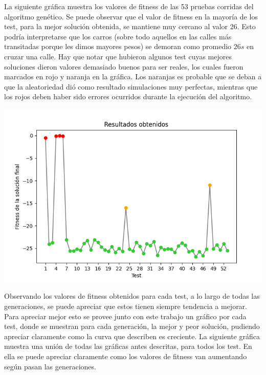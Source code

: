 \documentclass[colorinlistoftodos,twoside,twocolumn]{article} %
\begin{document}
	La siguiente gr\'afica muestra los valores de fitness de las 53 pruebas corridas del algoritmo gen\'etico. Se puede observar que el valor de fitness en la mayor\'ia de los test, para la mejor soluci\'on obtenida, se mantiene muy cercano al valor 26. Esto podr\'ia interpretarse que los carros (sobre todo aquellos en las calles m\'as transitadas porque les dimos mayores pesos) se demoran como promedio $26s$ en cruzar una calle. Hay que notar que hubieron algunos test cuyas mejores soluciones dieron valores demasiado buenos para ser reales, los cuales fueron marcados en rojo y naranja en la gr\'afica. Los naranjas es probable que se deban a que la aleatoriedad dió como resultado simulaciones muy perfectas, mientras que los rojos deben haber sido errores ocurridos durante la ejecuci\'on del algoritmo.
	
	\begin{center}
		\includegraphics[width=\columnwidth]{graphic_resultados_obtenidos.png}
	\end{center}

	Observando los valores de fitness obtenidos para cada test, a lo largo de todas las generaciones, se puede apreciar que estos tienen siempre tendencia a mejorar. Para apreciar mejor esto se provee junto con este trabajo un gr\'afico por cada test, donde se muestran para cada generaci\'on, la mejor y peor soluci\'on, pudiendo apreciar claramente como la curva que describen es creciente. La siguiente gr\'afica muestra una uni\'on de todas las gr\'aficas antes descritas, para todos los test. En ella se puede apreciar claramente como los valores de fitness van aumentando seg\'un pasan las generaciones.
\end{document}
